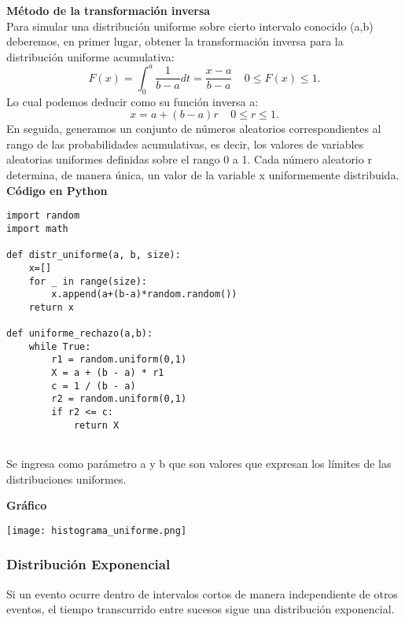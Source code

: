 \documentclass[11pt]{article}
\begin{document}
\noindent\textbf{Método de la transformación inversa}\\
  Para simular una distribución uniforme sobre cierto intervalo conocido (a,b) deberemos, en primer lugar, obtener la transformación inversa para la distribución uniforme acumulativa:
\begin{equation}
    F(x) = \int_{0}^{a}\frac{1}{b-a}dt = \frac{x-a}{b-a} \ \text{  } \ 0 \leq F(x) \leq 1.
  \end{equation}
Lo cual podemos deducir como su función inversa a:
  \begin{equation}
  x = a +(b-a)r \ \text{  }\ 0 \leq r \leq 1.
  \end{equation}
En seguida, generamos un conjunto de números aleatorios correspondientes al rango de las probabilidades acumulativas, es decir, los valores de variables aleatorias uniformes definidas sobre el rango 0 a 1. Cada número aleatorio r determina, de manera única, un valor de la variable x uniformemente distribuida.
\newpage
\noindent\textbf{Código en Python}

\begin{lstlisting}
import random
import math

def distr_uniforme(a, b, size):
    x=[]
    for _ in range(size):
        x.append(a+(b-a)*random.random())
    return x

def uniforme_rechazo(a,b):
    while True:
        r1 = random.uniform(0,1)
        X = a + (b - a) * r1
        c = 1 / (b - a)
        r2 = random.uniform(0,1) 
        if r2 <= c:
            return X
    
\end{lstlisting}
Se ingresa como parámetro a y b que son valores que expresan los límites de las distribuciones uniformes.

\noindent\textbf{Gráfico}

\begin{center}
\texttt{[image: histograma\_uniforme.png]}
\end{center}


\newpage

\subsubsection{Distribución Exponencial}

Si un evento ocurre dentro de intervalos cortos de manera independiente de otros eventos, el tiempo transcurrido entre sucesos sigue una distribución exponencial.
\end{document}
